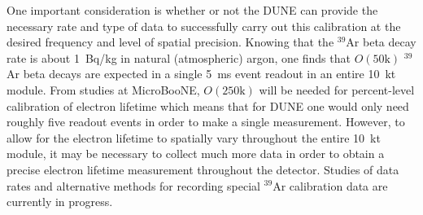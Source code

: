 One important consideration is whether or not the DUNE 
 can provide the necessary rate and type of data 
to successfully carry out this calibration at the desired frequency and level of spatial precision.  Knowing that the $^{39}$Ar beta decay rate is about 1~Bq/kg in natural (atmospheric) argon, one finds that $O(\mathrm{50k})$ $^{39}$Ar beta decays are expected in a single 5~ms event readout in an entire 10~kt module.  
From studies at MicroBooNE, $O(\mathrm{250k})$ will be needed 
for percent-level calibration of electron lifetime which means that for DUNE one would only need roughly five readout events in order to make a single measurement. 
However, to allow for the electron lifetime to spatially vary throughout the entire 10~kt module, it may be necessary to collect much more data in order to obtain a precise electron lifetime measurement throughout the detector.  
Studies of data rates and alternative methods for recording special $^{39}$Ar calibration data are currently in progress.


